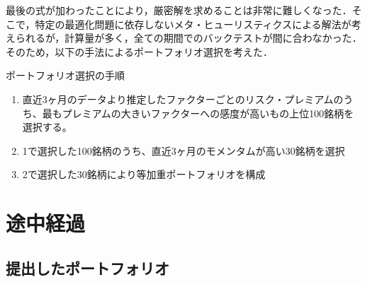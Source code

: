 \documentclass[11pt]{jreport}
\begin{document}
最後の式が加わったことにより，厳密解を求めることは非常に難しくなった．そこで，特定の最適化問題に依存しないメタ・ヒューリスティクスによる解法が考えられるが，計算量が多く，全ての期間でのバックテストが間に合わなかった．そのため，以下の手法によるポートフォリオ選択を考えた．

\begin{itembox}[l]{ポートフォリオ選択の手順}
\begin{enumerate}
\item 直近3ヶ月のデータより推定したファクターごとのリスク・プレミアムのうち、最もプレミアムの大きいファクターへの感度が高いもの上位100銘柄を選択する。
\item 1で選択した100銘柄のうち、直近3ヶ月のモメンタムが高い30銘柄を選択
\item 2で選択した30銘柄により等加重ポートフォリオを構成
\end{enumerate}
\end{itembox}

\chapter{途中経過}
\section{提出したポートフォリオ}
\end{document}
